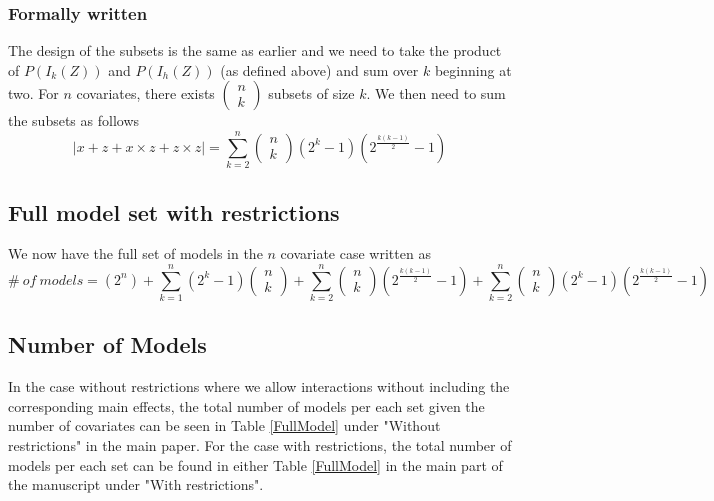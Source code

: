 \subsubsection{Formally written}
The design of the subsets is the same as earlier and we need to take the product of
$P\left(I_k\left(Z\right)\right)$ and $P\left(I_h\left(Z\right)\right)$ (as defined above) and sum over $k$ beginning at two.
For $n$ covariates, there exists $\left( \begin{array}{c}
n \\ 
k \end{array}
\right)$ subsets of size $k$. We then need to sum the subsets as follows
\[|x + z + x \times z+z \times z|=\sum^n_{k=2}{\left( \begin{array}{c}
n \\ 
k \end{array}
\right)\left(2^k-1\right)\left(2^{\frac{k\left(k-1\right)}{2}}-1\right)}\] 

\subsection{Full model set with restrictions}
We now have the full set of models in the $n$ covariate case written as
\[\#\ of\ models=\left(2^n\right)+\sum^n_{k=1}{\left(2^k-1\right)\left( \begin{array}{c}
n \\ 
k \end{array}
\right)}+\sum^n_{k=2}{\left( \begin{array}{c}
n \\ 
k \end{array}
\right)\left(2^{\frac{k\left(k-1\right)}{2}}-1\right)}+\sum^n_{k=2}{\left( \begin{array}{c}
n \\ 
k \end{array}
\right)\left(2^k-1\right)\left(2^{\frac{k\left(k-1\right)}{2}}-1\right)}\] 

\subsection{Number of Models}
In the case without restrictions where we allow interactions without including the corresponding main effects, the total number of models per each set given the number of covariates can be seen in Table \ref{FullModel} under "Without restrictions" in the main paper. For the case with restrictions, the total number of models per each set can be found in either Table \ref{FullModel} in the main part of the manuscript under "With restrictions". 



